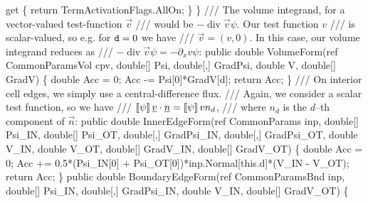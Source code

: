 {\btab    get \{ return TermActivationFlags.AllOn; \}\newline 
\btab \}\newline 
 \newline 
    /// The volume integrand, for a vector-valued test-function $\vec{v}$
    /// would be $-\operatorname{div}{\vec{v}} \psi$. Our test function $v$
    /// is scalar-valued, so e.g. for ${\tt d} = 0$ we have
    /// $\vec{v} = (v,0)$. In this case, our volume integrand reduces as 
    /// $-\operatorname{div}{\vec{v}} \psi = -\partial_x v \psi$:
\btab public double VolumeForm(ref CommonParamsVol cpv, \newline 
\btab \btab    double[] Psi, double[,] GradPsi, \newline 
\btab \btab    double V, double[] GradV) \{\newline 
 \newline 
\btab \btab double Acc = 0;\newline 
\btab \btab Acc -= Psi[0]*GradV[d];\newline 
\btab \btab return Acc;\newline 
\btab \}        \newline 
 \newline 
    /// On interior cell edges, we simply use a central-difference flux.
    /// Again, we consider a scalar test function, so we have
    /// $ \left[\!\left[{\psi}\right]\!\right] \underline{v} \cdot \underline{n} = \left[\!\left[{\psi}\right]\!\right] v n_d $,
    /// where $n_d$ is the $d$--th component of $\vec{n}$:
\btab public double InnerEdgeForm(ref CommonParams inp, \newline 
\btab \btab double[] Psi\_IN, double[] Psi\_OT, \newline 
\btab \btab double[,] GradPsi\_IN, double[,] GradPsi\_OT, \newline 
\btab \btab double V\_IN, double V\_OT, double[] GradV\_IN, double[] GradV\_OT) \{\newline 
 \newline 
\btab \btab double Acc = 0;\newline 
\btab \btab Acc += 0.5*(Psi\_IN[0] + Psi\_OT[0])*inp.Normal[this.d]*(V\_IN - V\_OT);\newline 
\btab \btab return Acc;  \newline 
\btab  \}\newline 
 \newline 
\btab public double BoundaryEdgeForm(ref CommonParamsBnd inp, \newline 
\btab \btab double[] Psi\_IN, double[,] GradPsi\_IN, double V\_IN, double[] GradV\_OT) \{\newline 
}
